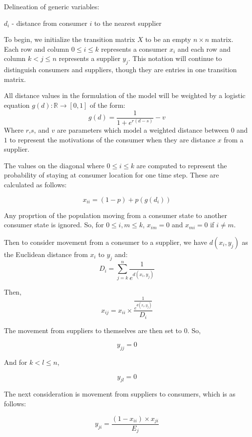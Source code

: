\documentclass[twoside,twocolumn]{article}
\begin{document}
Delineation of generic variables:


$d_{i}$ - distance from consumer $i$ to the nearest supplier

To begin, we initialize the transition matrix $X$ to be an empty $n \times n$ matrix.
Each row and column $0 \leq i \leq k$ represents a consumer $x_i$ and each row and column $k < j \leq n$ represents a supplier $y_j$.
This notation will continue to distinguish consumers and suppliers, though they are entries in one transition matrix. %

All distance values in the formulation of the model will be weighted by a logistic equation $g(d): \mathbb{R} \rightarrow [0,1]$ of the form:
\begin{equation}
g(d) = \frac{1}{1 + e^{r(d-s)}} - v
\end{equation}
Where $r$,$s$, and $v$ are parameters which model  a weighted distance between $0$ and $1$ to represent the motivations of the consumer when they are distance $x$ from a supplier. %

The values on the diagonal where $0 \leq i \leq k$ are computed to represent the probability of staying at consumer location for one time step.
These are calculated as follows:

$$x_{ii} = (1-p) + p(g(d_{i}))$$

Any proprtion of the population moving from a consumer state to another consumer state is ignored. %
So, for $0 \leq i,m \leq k$, $x_{im} = 0$ and $x_{mi} = 0$ if $i \neq m$.

Then to consider movement from a consumer to a supplier, we have $d(x_i, y_j)$ as the Euclidean distance from $x_i$ to $y_j$ and:
$$D_i = \sum_{j=k}^{n} \frac{1}{e^{d(x_i,y_j)}}$$

Then,
$$x_{ij} = x_{ii} \times \frac{\frac{1}{e^{d(x_i,y_j)}}}{D_i}$$

The movement from suppliers to themselves are then set to 0.
So,

$$y_{jj} = 0$$

And for $k < l \leq n$,

$$y_{jl} = 0$$ %

The next consideration is movement from suppliers to consumers, which is as follows:

$$y_{ji} = \frac{(1-x_{ii})\times x_{ji}}{E_j}$$
\end{document}
